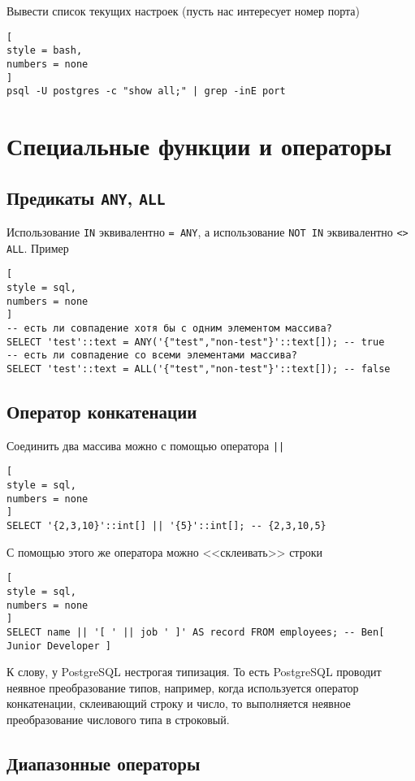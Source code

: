 \documentclass[%
	11pt,
	a4paper,
	utf8,
		]{article}
\begin{document}
Вывести список текущих настроек (пусть нас интересует номер порта)
\begin{lstlisting}[
style = bash,
numbers = none	
]
psql -U postgres -c "show all;" | grep -inE port
\end{lstlisting}



\section{Специальные функции и операторы}

\subsection{Предикаты \texttt{ANY}, \texttt{ALL}}

Использование \texttt{IN} эквивалентно \texttt{= ANY}, а использование \texttt{NOT IN} эквивалентно \texttt{<> ALL}. Пример
\begin{lstlisting}[
style = sql,
numbers = none
]
-- есть ли совпадение хотя бы с одним элементом массива?
SELECT 'test'::text = ANY('{"test","non-test"}'::text[]); -- true
-- есть ли совпадение со всеми элементами массива?
SELECT 'test'::text = ALL('{"test","non-test"}'::text[]); -- false
\end{lstlisting}

\subsection{Оператор конкатенации}

Соединить два массива можно с помощью оператора \texttt{||} 
\begin{lstlisting}[
style = sql,
numbers = none
]
SELECT '{2,3,10}'::int[] || '{5}'::int[]; -- {2,3,10,5}
\end{lstlisting}

С помощью этого же оператора можно <<склеивать>> строки
\begin{lstlisting}[
style = sql,
numbers = none
]
SELECT name || '[ ' || job ' ]' AS record FROM employees; -- Ben[ Junior Developer ]
\end{lstlisting}

К слову, у PostgreSQL нестрогая типизация. То есть PostgreSQL проводит неявное преобразование типов, например, когда используется оператор конкатенации, склеивающий строку и число, то выполняется неявное преобразование числового типа в строковый.

\subsection{Диапазонные операторы}
\end{document}
